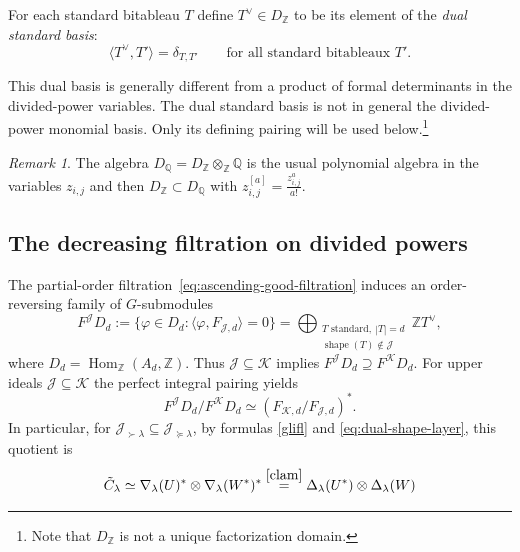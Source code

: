 \documentclass[10pt]{amsart}
\def\steq#1{ \stackrel{\eqref{#1}}}
\theoremstyle{definition}
\theoremstyle{remark}
\newtheorem{remark}[theorem]{Remark}
\newcommand{\Z}{\mathbb Z}
\newcommand{\Q}{\mathbb Q}
\begin{document}
For each standard   bitableau   $T$ define $T^\vee\in D_{\mathbb Z}$
to be its element of the \emph{dual standard basis}:
\begin{equation}\label{vee}
 \langle T^\vee,T'\rangle=\delta_{T,T'}
 \qquad\text{for all standard   bitableaux  }T'.
\end{equation}

This dual basis is generally different from a product of formal
determinants in the divided-power variables. The dual standard basis is not in general the divided-power monomial basis. Only its defining
pairing will be used below.\footnote{Note that $D_{\mathbb Z}$ is not a unique factorization domain.}
\begin{remark}\label{ovq} The algebra  $D_\Q=D_\Z\otimes_\Z\Q$ is the usual polynomial algebra in the variables $z_{i,j}$  and then $D_\Z\subset D_\Q$ with $z_{i,j}^{[a]}= \frac{z_{i,j}^ a}{a!}. $

\end{remark}\medskip

\subsection{The decreasing filtration on divided powers}
The partial-order filtration~\eqref{eq:ascending-good-filtration}
induces an order-reversing family of $G$-submodules
\begin{equation}\label{eq:decreasing-dual-filtration}
 F^{\mathcal J}D_d:=
 \{\varphi\in D_d:\langle\varphi,F_{\mathcal J,d}\rangle=0\}
 =\bigoplus_{\substack{T\text{ standard},\ |T|=d\\
              \operatorname{shape}(T)\notin\mathcal J}}
 \mathbb ZT^\vee,
\end{equation}
where $D_d=\operatorname{Hom}_{\mathbb Z}(A_d,\mathbb Z)$.
Thus $\mathcal J\subseteq\mathcal K$ implies
$F^{\mathcal J}D_d\supseteq F^{\mathcal K}D_d$.
For upper ideals $\mathcal J\subseteq\mathcal K$ the perfect
integral pairing yields
\begin{equation}\label{eq:dual-shape-layer}
 F^{\mathcal J}D_d/F^{\mathcal K}D_d
 \simeq(F_{\mathcal K,d}/F_{\mathcal J,d})^*.
\end{equation}
In particular, for $\mathcal J_{\succ \lambda}\subseteq
\mathcal J_{\succeq\lambda}$, by formulas \eqref{glifl} and \eqref{eq:dual-shape-layer}, this quotient is 
\begin{equation}\label{lacl}
\tilde C_\lambda\simeq\nabla_{\lambda }(U )^*\otimes\nabla _{\lambda }(W^* )^*\steq{clam}=\Delta_{\lambda }(U^* ) \otimes\Delta _{\lambda }(W  )
\end{equation}   
\medskip
\end{document}
